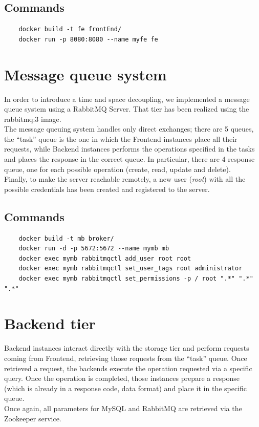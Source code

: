 \documentclass{article}
\begin{document}
\subsection{Commands}
\begin{verbatim}
    docker build -t fe frontEnd/
    docker run -p 8080:8080 --name myfe fe
\end{verbatim}




\section{Message queue system}
In order to introduce a time and space decoupling, we implemented a message queue system using a RabbitMQ Server. That tier has been realized using the rabbitmq:3 image.\\
The message queuing system handles only direct exchanges; there are 5 queues, the “task” queue is the one in which the Frontend instances place all their requests, while Backend instances performs the operations specified in the tasks and places the response in the correct queue. In particular, there are 4 response queue, one for each possible operation (create, read, update and delete). \\
Finally, to make the server reachable remotely, a new user (\textit{root}) with all the possible credentials has been created and registered to the server.
\subsection{Commands}
\begin{verbatim}
    docker build -t mb broker/
    docker run -d -p 5672:5672 --name mymb mb
    docker exec mymb rabbitmqctl add_user root root
    docker exec mymb rabbitmqctl set_user_tags root administrator
    docker exec mymb rabbitmqctl set_permissions -p / root ".*" ".*" ".*"
\end{verbatim}




\section{Backend tier}
Backend instances interact directly with the storage tier and perform requests coming from Frontend, retrieving those requests from the “task” queue. Once retrieved a request, the backends execute the operation requested via a specific query. Once the operation is completed, those instances prepare a response (which is already in a response code, data format) and place it in the specific queue.\\
Once again, all parameters for MySQL and RabbitMQ are retrieved via the Zookeeper service.
\end{document}
